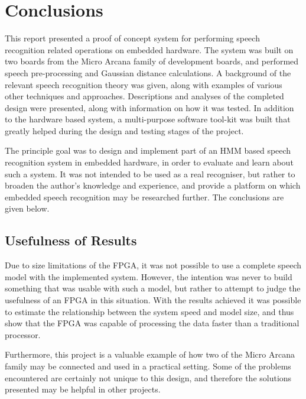 \chapter{Conclusions} %
\label{cha:conclusions_and_future_work}


This report presented a proof of concept system for performing speech recognition related operations on embedded hardware.  The system was built on two boards from the Micro Arcana family of development boards, and performed speech pre-processing and Gaussian distance calculations.  A background of the relevant speech recognition theory was given, along with examples of various other techniques and approaches.  Descriptions and analyses of the completed design were presented, along with information on how it was tested.  In addition to the hardware based system, a multi-purpose software tool-kit was built that greatly helped during the design and testing stages of the project.

The principle goal was to design and implement part of an HMM based speech recognition system in embedded hardware, in order to evaluate and learn about such a system.  It was not intended to be used as a real recogniser, but rather to broaden the author's knowledge and experience, and provide a platform on which embedded speech recognition may be researched further.  The conclusions are given below.


\section{Usefulness of Results} %
\label{sec:usefulness}
	Due to size limitations of the FPGA, it was not possible to use a complete speech model with the implemented system.  However, the intention was never to build something that was usable with such a model, but rather to attempt to judge the usefulness of an FPGA in this situation.  With the results achieved it was possible to estimate the relationship between the system speed and model size, and thus show that the FPGA was capable of processing the data faster than a traditional processor.

	Furthermore, this project is a valuable example of how two of the Micro Arcana family may be connected and used in a practical setting.  Some of the problems encountered are certainly not unique to this design, and therefore the solutions presented may be helpful in other projects.

